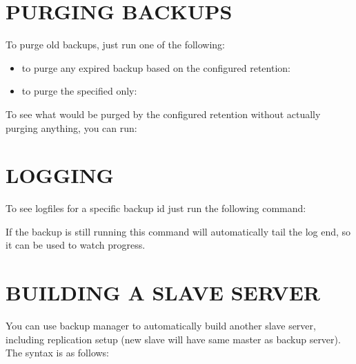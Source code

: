 \documentclass[letterpaper,10pt,english]{sphinxmanual}
\begin{document}
\sphinxAtStartPar
{}


\section{PURGING BACKUPS}
\label{\detokenize{mariadb-backup-manager:purging-backups}}
\sphinxAtStartPar
To purge old backups, just run one of the following:
\begin{itemize}
\item {} 
\sphinxAtStartPar
to purge any expired backup based on the configured retention:

\end{itemize}

\sphinxAtStartPar
{}
\begin{itemize}
\item {} 
\sphinxAtStartPar
to purge the specified  only:

\end{itemize}

\sphinxAtStartPar
{}

\sphinxAtStartPar
To see what would be purged by the configured retention without actually purging
anything, you can run:

\sphinxAtStartPar
{}


\section{LOGGING}
\label{\detokenize{mariadb-backup-manager:logging}}
\sphinxAtStartPar
To see logfiles for a specific backup id just run the following command:

\sphinxAtStartPar
{}

\sphinxAtStartPar
If the backup is still running this command will automatically tail the log end, so it can
be used to watch progress.


\section{BUILDING A SLAVE SERVER}
\label{\detokenize{mariadb-backup-manager:building-a-slave-server}}
\sphinxAtStartPar
You can use backup manager to automatically build another slave server, including replication
setup (new slave will have same master as backup server).
The syntax is as follows:
\end{document}
